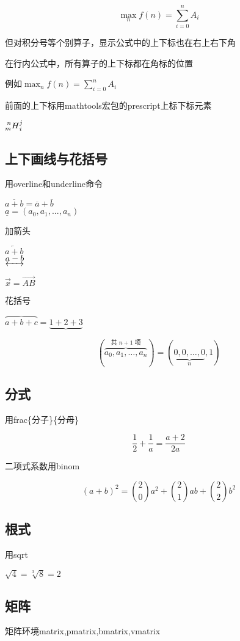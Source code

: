 \documentclass[12pt]{article}
\begin{document}
\[
	\max_n f(n) = \sum_{i=0}^n A_i
\]

但对积分号等个别算子，显示公式中的上下标也在右上右下角



在行内公式中，所有算子的上下标都在角标的位置

例如$\max_n f(n) = \sum_{i=0}^n A_i$

前面的上下标用mathtools宏包的prescript{上标}{下标}{元素}

$\prescript{n}{m}{H}_i^j$

\subsection{上下画线与花括号}

用overline和underline命令

$\overline{a+b} = 
\overline{a} + \overline{b}$ \\
$\underline{a} = (a_0,a_1,...,a_n)$

加箭头

$\overleftarrow{a+b}$\\
$\underleftrightarrow{a-b}$

$\vec{x} = \overrightarrow{AB}$

花括号

$\overbrace{a+b+c} = \underbrace{1+2+3}$

\[
(\overbrace{a_0,a_1,\dots,a_n}^{\text{共 $n+1$ 项}} )
 = ( \underbrace{0,0,\dots, 0}_{n}, 1)
 \]


\subsection{分式}
用frac\{分子\}\{分母\}

\[
\frac{1}{2} + \frac{1}{a} = \frac{a+2}{2a}
\]



二项式系数用binom

\[
(a+b)^2 = \binom{2}{0} a^2
+ \binom{2}{1} ab + \binom{2}{2} b^2
\]

\subsection{根式}

用sqrt

$\sqrt 4 = \sqrt[3]{8} = 2$

\subsection{矩阵}
矩阵环境matrix,pmatrix,bmatrix,vmatrix
\end{document}

